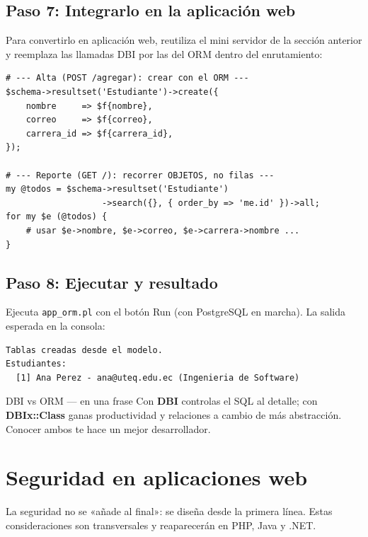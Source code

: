 \documentclass[11pt]{article}
\begin{document}
\subsection{Paso 7: Integrarlo en la aplicación web}
Para convertirlo en aplicación web, reutiliza el mini servidor de la sección anterior y reemplaza las llamadas DBI por las del ORM dentro del enrutamiento:

\begin{cajacodigo}
\begin{lstlisting}[style=perl]
# --- Alta (POST /agregar): crear con el ORM ---
$schema->resultset('Estudiante')->create({
    nombre     => $f{nombre},
    correo     => $f{correo},
    carrera_id => $f{carrera_id},
});

# --- Reporte (GET /): recorrer OBJETOS, no filas ---
my @todos = $schema->resultset('Estudiante')
                   ->search({}, { order_by => 'me.id' })->all;
for my $e (@todos) {
    # usar $e->nombre, $e->correo, $e->carrera->nombre ...
}
\end{lstlisting}
\end{cajacodigo}
\vspace{2pt}
\subsection{Paso 8: Ejecutar y resultado}
Ejecuta \texttt{app\_orm.pl} con el botón Run (con PostgreSQL en marcha). La salida esperada en la consola:

\begin{cajacodigo}
\begin{lstlisting}[style=markup]
Tablas creadas desde el modelo.
Estudiantes:
  [1] Ana Perez - ana@uteq.edu.ec (Ingenieria de Software)
\end{lstlisting}
\end{cajacodigo}
\vspace{2pt}
\begin{cajatip}{DBI vs ORM --- en una frase}
Con \textbf{DBI} controlas el SQL al detalle; con \textbf{DBIx::Class} ganas productividad y relaciones a cambio de más abstracción. Conocer ambos te hace un mejor desarrollador.\par
\end{cajatip}
\section{Seguridad en aplicaciones web}
La seguridad no se «añade al final»: se diseña desde la primera línea. Estas consideraciones son transversales y reaparecerán en PHP, Java y .NET.
\end{document}
